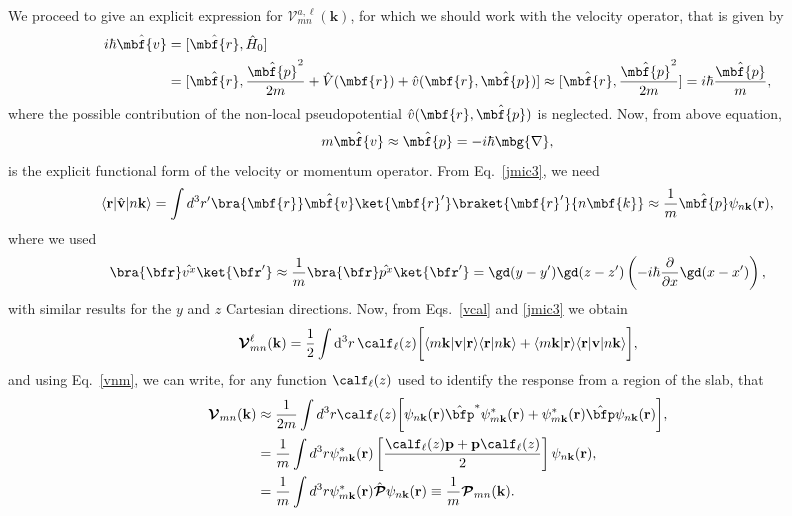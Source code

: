 We proceed to give an explicit expression for 
$\mathcal{V}^{a,\ell}_{mn}(\mathbf{k})$,
for which we should work with  
the velocity operator, that is given by
\begin{align}\label{vop2} 
i\hbar\hat{\mbf{v}}&=[\hat{\mbf{r}},\hat{H}_0]
\nonumber\\
&=
[\hat{\mbf{r}},\frac{\hat{\mbf{p}}^2}{2m} +
\hat{V}(\mbf{r})+\hat{v}(\mbf{r},\hat{\mbf{p}})]
\approx
[\hat{\mbf{r}},\frac{\hat{\mbf{p}}^2}{2m}]=i\hbar\frac{\hat{\mbf{p}}}{m},
\end{align} 
where the possible contribution of 
the non-local pseudopotential $\hat{v}(\mbf{r},\hat{\mbf{p}})$
is neglected. Now, from above equation,
\begin{equation}\label{velo}
m\hat{\mbf{v}}\approx\hat{\mbf{p}}=-i\hbar\mbg{\nabla},
\end{equation}
is the explicit functional form of the velocity or momentum operator.
From Eq.~\eqref{jmic3}, we need 
\begin{equation}\label{vnm}
\langle \mathbf{r} | \hat{\mathbf v} | n\mathbf{k} \rangle
=\int d^3 r' \bra{\mbf{r}}\hat{\mbf{v}}\ket{\mbf{r}'}
\braket{\mbf{r}'}{n\mbf{k}}
\approx\frac{1}{m}\hat{\mbf{p}}\psi_{n\mathbf{k}}(\mathbf{r}),
\end{equation} 
where we used 
\begin{equation}\label{rvnk}
\bra{\bfr}\hat{v^x}\ket{\bfr'}
\approx \frac{1}{m}\bra{\bfr}\hat{p^x}\ket{\bfr'}
=
\gd(y-y')\gd(z-z')\left(-i\hbar\frac{\partial}{\partial x}\gd(x-x')\right),
\end{equation}
with similar results for the $y$ and $z$ Cartesian directions.
Now, from 
Eqs.~\eqref{vcal} and \eqref{jmic3} we obtain
\begin{equation}
{\boldsymbol{\mathcal{V}}}^{\ell}_{mn}({\mathbf k})=
\frac{1}{2}
\int \mathrm{d}^3 r\,
 \calf_\ell(z)
\bigg[
\langle m\mathbf{k}|\mathbf{v} | \mathbf{r}\rangle
\langle \mathbf{r} | n \mathbf k \rangle +
\langle m\mathbf{k} | \mathbf{r}\rangle
\langle \mathbf{r} | \mathbf{v} | n \mathbf k \rangle\bigg],
\label{intj}
\end{equation}   
and using Eq.~\eqref{vnm},
we can write, for any  function $\calf_\ell(z)$ used
to identify the response from a region of the slab, that
\begin{align}%
{\boldsymbol{\mathcal{V}}}_{mn}(\mathbf{k})&\approx
\frac{1}{2m}\int d^3 r
\calf_\ell(z)
 \bigg[
\psi_{n\mathbf{k}}(\mathbf{r})
\hat\bfp^*\psi^*_{m\mathbf{k}}(\mathbf{r})
+ 
\psi^*_{m\mathbf{k}}(\mathbf{r})\hat\bfp
\psi_{n\mathbf{k}}(\mathbf{r})
\bigg], \label{pofs1}  \\
&=
\frac{1}{m}\int d^3 r
\psi^*_{m\mathbf{k}}(\mathbf{r})
\left[\frac{\calf_\ell(z) \mathbf{p} +
\mathbf{p} \calf_\ell(z)}{2}\right]
\psi_{n\mathbf{k}}(\mathbf{r})
,\label{pofs2} \\
&=\frac{1}{m}\int d^3 r
\psi^*_{m\mathbf{k}}(\mathbf{r})\hat{\boldsymbol{\mathcal{P}}}
\psi_{n\mathbf{k}}(\mathbf{r})\equiv \frac{1}{m}{\boldsymbol{\mathcal{P}}}_{mn}(\mathbf{k}).
\end{align}

